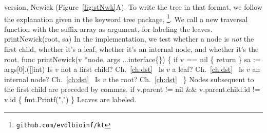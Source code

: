 version, Newick (Figure~\ref{fig:stNwk}A). To write the tree in that
format, we follow the explanation given in the keyword tree package,
\footnote{\texttt{github.com/evolbioinf/kt}}. We call a new
traversal function with the suffix array as argument, for labeling the
leaves.
\nwenddocs{}\endmoddef\nwstartdeflinemarkup{}\nwenddeflinemarkup
printNewick(root, sa)
\nwendcode{}\nwdocspar
In the implementation, we test whether a node is \emph{not} the first
child, whether it's a leaf, whether it's an internal node, and whether
it's the root.
\nwenddocs{}\plusendmoddef\nwstartdeflinemarkup{}\nwenddeflinemarkup
func printNewick(v *node, args ...interface\{\}) \{
          if v == nil \{ return \}
          sa := args[0].([]int)
          \LA{}Is $v$ not a first child? Ch.~\ref{ch:dst}~{\nwtagstyle{}}\RA{}
          \LA{}Is $v$ a leaf? Ch.~\ref{ch:dst}~{\nwtagstyle{}}\RA{}
          \LA{}Is $v$ an internal node? Ch.~\ref{ch:dst}~{\nwtagstyle{}}\RA{}
          \LA{}Is $v$ the root? Ch.~\ref{ch:dst}~{\nwtagstyle{}}\RA{}
\}
\nwendcode{}\nwdocspar
Nodes subsequent to the first child are preceded by commas.
\nwenddocs{}\endmoddef\nwstartdeflinemarkup{}\nwenddeflinemarkup
if v.parent != nil && v.parent.child.id != v.id \{
          fmt.Printf(",")
\}
\nwendcode{}\nwdocspar
Leaves are labeled.
\nwenddocs{}\endmoddef\nwstartdeflinemarkup{}\nwenddeflinemarkup
